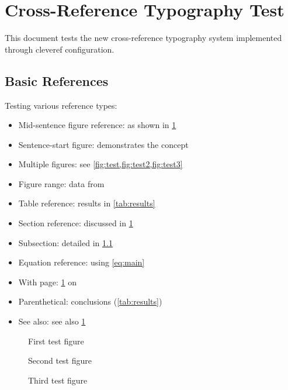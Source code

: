 \documentclass[11pt,letterpaper]{article}
\begin{document}
\section{Cross-Reference Typography Test}
\label{sec:intro}

This document tests the new cross-reference typography system implemented through cleveref configuration.

\subsection{Basic References}
\label{subsec:basic}

Testing various reference types:

\begin{itemize}
\item Mid-sentence figure reference: as shown in \cref{fig:test}
\item Sentence-start figure:  demonstrates the concept
\item Multiple figures: see \cref{fig:test,fig:test2,fig:test3}
\item Figure range: data from 
\item Table reference: results in \cref{tab:results}
\item Section reference: discussed in \cref{sec:intro}
\item Subsection: detailed in \cref{subsec:basic}
\item Equation reference: using \cref{eq:main}
\item With page: \cref{fig:test} on 
\item Parenthetical: conclusions (\cref{tab:results})
\item See also: see also \cref{sec:intro}
\end{itemize}

\begin{figure}[ht]
  \centering
  \caption{First test figure}
  \label{fig:test}
\end{figure}

\begin{figure}[ht]
  \centering
  \caption{Second test figure}
  \label{fig:test2}
\end{figure}

\begin{figure}[ht]
  \centering
  \caption{Third test figure}
  \label{fig:test3}
\end{figure}
\end{document}
